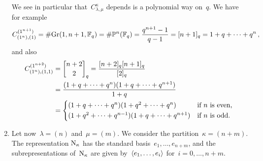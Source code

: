 \documentclass[a4paper,11pt]{scrartcl}
\begin{document}
\begin{example}
\begin{enumerate}
      We see in particular that~$C^{\kappa}_{\lambda, \mu}$ depends is a polynomial way on~$q$. 
      We have for example
      \[
        C^{(1^{n+1})}_{(1^n),(1)}
        =
        \# {\operatorname{Gr}(1, n+1, \mathbb{F}_q)}
        = 
        \# {\mathbb{P}^n(\mathbb{F}_q)}
        =
        \frac{ q^{n+1} - 1 }{ q - 1 }
        =
        [n+1]_q
        =
        1 + q + \dotsb + q^n \,,
      \]
      and also
      \begin{align*}
        C^{(1^{n+2})}_{(1^n),(1,1)}
        &=
        \qbinomial{n+2}{2}_q
        =
        \frac{[n+2]_q [n+1]_q}{[2]_q}
        \\
        &=
        \frac{ (1 + q + \dotsb + q^n) (1 + q + \dotsb + q^{n+1}) }{ 1 + q }
        \\
        &=
        \begin{cases*}
          (1 + q + \dotsb + q^n) (1 + q^2 + \dotsb + q^n)
          &
          if~$n$ is even,
          \\
          (1 + q^2 + \dotsb + q^{n-1}) (1 + q + \dotsb + q^{n+1})
          &
          if~$n$ is odd.
        \end{cases*}
      \end{align*}
    \item
      Let now~$\lambda = (n)$ and~$\mu = (m)$.
      We consider the partition~$\kappa = (n+m)$. 
      The representation$~\mathrm{N}_{\kappa}$ has the standard basis~$e_1, \dotsc, e_{n+m}$, and the subrepresentations of~$\mathrm{N}_{\kappa}$ are given by~$\langle e_1, \dotsc, e_i\rangle$ for~$i = 0, \dotsc, n+m$.

\end{enumerate}
\end{example}
\end{document}
